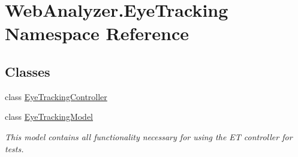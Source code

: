 \hypertarget{namespace_web_analyzer_1_1_eye_tracking}{}\section{Web\+Analyzer.\+Eye\+Tracking Namespace Reference}
\label{namespace_web_analyzer_1_1_eye_tracking}
\subsection*{Classes}
\begin{DoxyCompactItemize}
\item 
class \hyperlink{class_web_analyzer_1_1_eye_tracking_1_1_eye_tracking_controller}{Eye\+Tracking\+Controller}
\item 
class \hyperlink{class_web_analyzer_1_1_eye_tracking_1_1_eye_tracking_model}{Eye\+Tracking\+Model}
\begin{DoxyCompactList}\small\item\em This model contains all functionality necessary for using the E\+T controller for tests. \end{DoxyCompactList}\end{DoxyCompactItemize}
